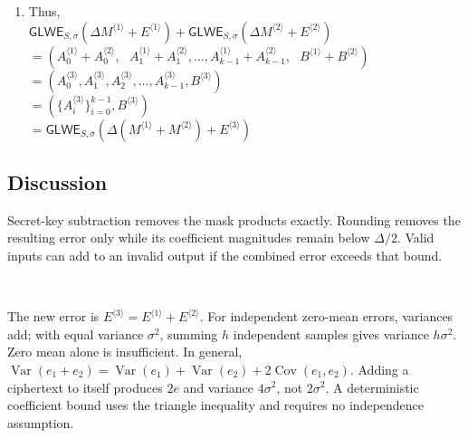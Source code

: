 \begin{myproof}
\begin{enumerate}
this means that $(A_0^{\langle 3 \rangle}, A_1^{\langle 3 \rangle}, A_2^{\langle 3 \rangle}, \ldots, A_{k-1}^{\langle 3 \rangle}, B^{\langle 3 \rangle})$ form the ciphertext: $\textsf{GLWE}_{S, \sigma}(\Delta \cdot (M^{\langle 1 \rangle} + M^{\langle 2 \rangle}) + E^{\langle 3 \rangle})$. \\
\item Thus, \\
$\textsf{GLWE}_{S, \sigma}(\Delta M^{\langle 1 \rangle} + E^{\langle 1 \rangle}) + \textsf{GLWE}_{S, \sigma}(\Delta M^{\langle 2 \rangle} + E^{\langle 2 \rangle})$ \\
$ = ( A_0^{\langle 1 \rangle} + A_0^{\langle 2 \rangle}, \text{ } A_1^{\langle 1 \rangle} + A_1^{\langle 2 \rangle},\ldots, A_{k-1}^{\langle 1 \rangle} + A_{k-1}^{\langle 2 \rangle}, \text{ } B^{\langle 1 \rangle} + B^{\langle 2 \rangle} )$ \\
$ = ( A_0^{\langle 3 \rangle}, A_1^{\langle 3 \rangle}, A_2^{\langle 3 \rangle}, \ldots,  A_{k-1}^{\langle 3 \rangle}, B^{\langle 3 \rangle})$ \\
$ = ( \{A_i^{\langle 3 \rangle}\}_{i=0}^{k-1}, B^{\langle 3 \rangle})$ \\
$= \textsf{GLWE}_{S, \sigma}(\Delta (M^{\langle 1 \rangle} + M^{\langle 2 \rangle}) + E^{\langle 3 \rangle})$


\end{enumerate}
\end{myproof}

\subsection{Discussion}
\label{subsubsec:glwe-add-cipher-discuss} 

 Secret-key subtraction removes the mask products exactly. Rounding removes the resulting error only while its coefficient magnitudes remain below $\Delta/2$. Valid inputs can add to an invalid output if the combined error exceeds that bound.

$ $

 The new error is $E^{\langle3\rangle}=E^{\langle1\rangle}+E^{\langle2\rangle}$. For independent zero-mean errors, variances add; with equal variance $\sigma^2$, summing $h$ independent samples gives variance $h\sigma^2$. Zero mean alone is insufficient. In general, $\operatorname{Var}(e_1+e_2)=\operatorname{Var}(e_1)+\operatorname{Var}(e_2)+2\operatorname{Cov}(e_1,e_2)$. Adding a ciphertext to itself produces $2e$ and variance $4\sigma^2$, not $2\sigma^2$. A deterministic coefficient bound uses the triangle inequality and requires no independence assumption.

